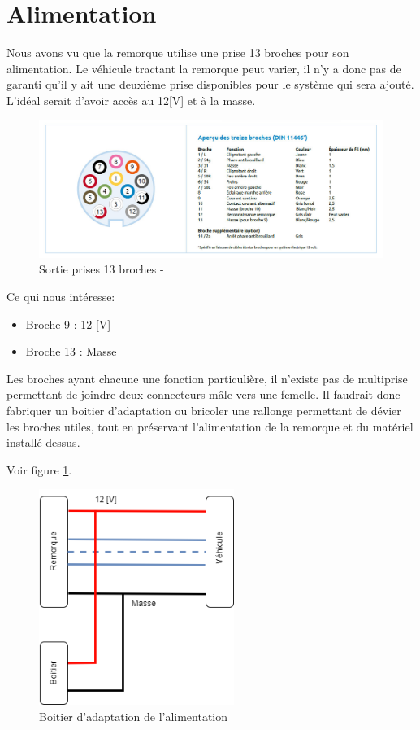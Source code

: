 \section{Alimentation}
Nous avons vu que la remorque utilise une prise 13 broches pour son alimentation. Le véhicule tractant la remorque peut varier, il n'y a donc pas de
garanti qu'il y ait une deuxième prise disponibles pour le système qui sera ajouté. L'idéal serait d'avoir accès au 12[V] et à la masse.
\begin{figure}[H]
    \centering
    \includegraphics[width=14cm]{assets/figures/broches.jpg}
    \caption{Sortie prises 13 broches - \cite{prise}}
\end{figure}
Ce qui nous intéresse:
\begin{itemize}
    \item Broche 9  : 12 [V]
    \item Broche 13 : Masse
\end{itemize}
Les broches ayant chacune une fonction particulière, il n'existe pas de multiprise permettant de joindre deux connecteurs mâle vers une femelle.
Il faudrait donc fabriquer un boitier d'adaptation ou bricoler une rallonge permettant de dévier les broches utiles, tout en préservant l'alimentation de la remorque et du matériel installé dessus.


Voir figure \ref{alim}.
\begin{figure}[h]
    \centering
    \includegraphics[height=7cm]{assets/figures/alimentation.png}
    \caption{Boitier d'adaptation de l'alimentation \label{alim}}
\end{figure}
\newpage

